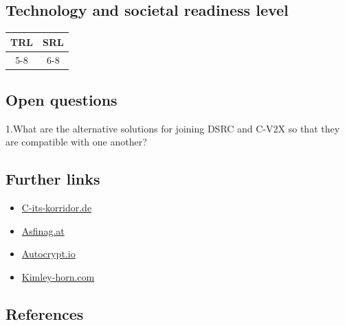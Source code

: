 \documentclass[
]{book}
\providecommand{\tightlist}{%
  \setlength{\itemsep}{0pt}\setlength{\parskip}{0pt}}
\begin{document}
\hypertarget{technology-and-societal-readiness-level-41}{%
\subsection*{Technology and societal readiness level}\label{technology-and-societal-readiness-level-41}}

\begin{longtable}[]{@{}cc@{}}
\toprule
TRL & SRL\tabularnewline
\midrule
\endhead
5-8 & 6-8\tabularnewline
\bottomrule
\end{longtable}

\hypertarget{open-questions-41}{%
\subsection*{Open questions}\label{open-questions-41}}

1.What are the alternative solutions for joining DSRC and C-V2X so that they are compatible with one another?

\hypertarget{further-links-34}{%
\subsection*{Further links}\label{further-links-34}}

\begin{itemize}
\tightlist
\item
  \href{https://c-its-korridor.de/?menuId=1\&sp=en}{C-its-korridor.de}
\item
  \href{https://www.asfinag.at/ueber-uns/newsroom/pressemeldungen/2020/wlan-ausbau-cooperative-intelligent-transport-systems/}{Asfinag.at}
\item
  \href{https://www.autocrypt.io/blog-post/dsrc-vs-c-v2x-detailed-comparison}{Autocrypt.io}
\item
  \href{https://www.kimley-horn.com/news-insights/dsrc-cv2x-comparison-future-connected-vehicles/}{Kimley-horn.com}
\end{itemize}

\hypertarget{references-41}{%
\subsection*{References}\label{references-41}}
\end{document}
